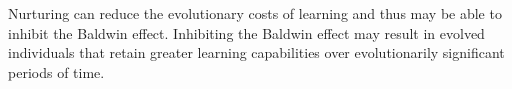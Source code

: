 \documentclass[master]{outhesis}
\begin{document}
Nurturing can reduce the evolutionary costs of learning and thus may be able to inhibit the Baldwin effect.
Inhibiting the Baldwin effect may result in evolved individuals that retain greater learning capabilities over evolutionarily significant periods of time.

{}


\makebackmatter
\end{document}
